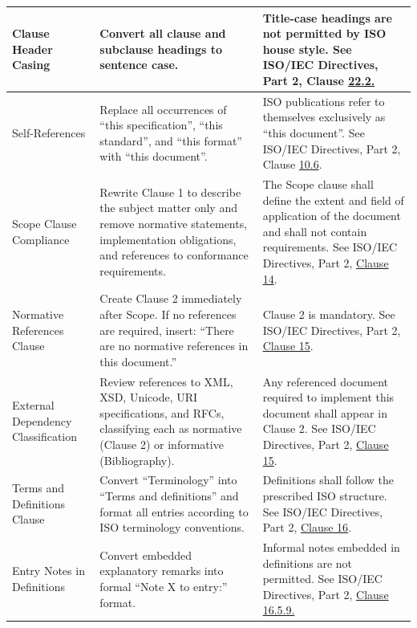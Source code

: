 \documentclass[11pt,a4paper]{article}
\begin{document}
\begin{table}[h]
\begin{tabular}{|l|l|l|}
Clause Header Casing & Convert all clause and subclause headings to sentence case. & Title-case headings are not permitted by ISO house style. See ISO/IEC Directives, Part 2, Clause \href{https://www.iso.org/sites/directives/current/part2/index.xhtml\#\_idTextAnchor005}{22.2.} \\ \hline
Self-References & Replace all occurrences of “this specification”, “this standard”, and “this format” with “this document”. & ISO publications refer to themselves exclusively as “this document”. See ISO/IEC Directives, Part 2, Clause \href{https://www.iso.org/sites/directives/current/part2/index.xhtml\#\_idTextAnchor005}{10.6}. \\ \hline
Scope Clause Compliance & Rewrite Clause 1 to describe the subject matter only and remove normative statements, implementation obligations, and references to conformance requirements. & The Scope clause shall define the extent and field of application of the document and shall not contain requirements. See ISO/IEC Directives, Part 2, \href{https://www.iso.org/sites/directives/current/part2/index.xhtml\#\_idTextAnchor005}{Clause 14}. \\ \hline
Normative References Clause & Create Clause 2 immediately after Scope. If no references are required, insert: “There are no normative references in this document.” & Clause 2 is mandatory. See ISO/IEC Directives, Part 2, \href{https://www.iso.org/sites/directives/current/part2/index.xhtml\#\_idTextAnchor005}{Clause 15}. \\ \hline
External Dependency Classification & Review references to XML, XSD, Unicode, URI specifications, and RFCs, classifying each as normative (Clause 2) or informative (Bibliography). & Any referenced document required to implement this document shall appear in Clause 2. See ISO/IEC Directives, Part 2, \href{https://www.iso.org/sites/directives/current/part2/index.xhtml\#\_idTextAnchor005}{Clause 15}. \\ \hline
Terms and Definitions Clause & Convert “Terminology” into “Terms and definitions” and format all entries according to ISO terminology conventions. & Definitions shall follow the prescribed ISO structure. See ISO/IEC Directives, Part 2, \href{https://www.iso.org/sites/directives/current/part2/index.xhtml\#\_idTextAnchor005}{Clause 16}. \\ \hline
Entry Notes in Definitions & Convert embedded explanatory remarks into formal “Note X to entry:” format. & Informal notes embedded in definitions are not permitted. See ISO/IEC Directives, Part 2, \href{https://www.iso.org/sites/directives/current/part2/index.xhtml\#\_idTextAnchor005}{Clause 16.5.9.} \\ \hline

\end{tabular}
\end{table}
\end{document}
